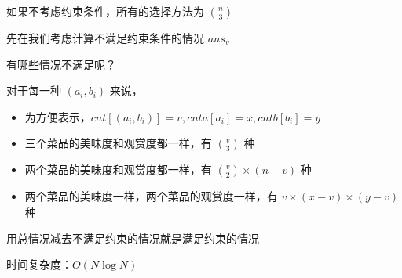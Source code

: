 \begin{frame} %

如果不考虑约束条件，所有的选择方法为 ${n \choose 3}$

先在我们考虑计算不满足约束条件的情况 $ans_v$

有哪些情况不满足呢？

对于每一种 $(a_i, b_i)$ 来说，

\begin{itemize}
	\item 为方便表示，$cnt[(a_i, b_i)] = v, cnta[a_i] = x, cntb[b_i] = y$
	\item 三个菜品的美味度和观赏度都一样，有 ${v \choose 3}$ 种
	\item 两个菜品的美味度和观赏度都一样，有 ${v \choose 2} \times (n - v)$ 种
	\item 两个菜品的美味度一样，两个菜品的观赏度一样，有 ${v\times (x - v)\times (y - v)}$ 种
\end{itemize}

用总情况减去不满足约束的情况就是满足约束的情况

时间复杂度：$O(N\log N)$
\end{frame}


